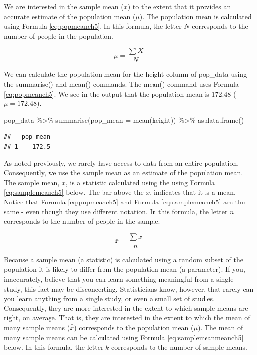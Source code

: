 \documentclass[
]{krantz}
\makeatletter
\newenvironment{Shaded}{\begin{snugshade}}{\end{snugshade}}
\newcommand{\AttributeTok}[1]{\textcolor[rgb]{0.61,0.61,0.61}{#1}}
\newcommand{\FunctionTok}[1]{\textcolor[rgb]{0,0,0}{#1}}
\newcommand{\NormalTok}[1]{#1}
\newcommand{\SpecialCharTok}[1]{\textcolor[rgb]{0,0,0}{#1}}
\newenvironment{kframe}{%
\medskip{}
\setlength{\fboxsep}{.8em}
 \def\at@end@of@kframe{}%
 \ifinner\ifhmode%
  \def\at@end@of@kframe{\end{minipage}}%
  \begin{minipage}{\columnwidth}%
 \fi\fi%
 \def\FrameCommand##1{\hskip\@totalleftmargin \hskip-\fboxsep
 \colorbox{shadecolor}{##1}\hskip-\fboxsep
     \hskip-\linewidth \hskip-\@totalleftmargin \hskip\columnwidth}%
 \MakeFramed {\advance\hsize-\width
   \@totalleftmargin\z@ \linewidth\hsize
   \@setminipage}}%
 {\par\unskip\endMakeFramed%
 \at@end@of@kframe}
\renewenvironment{Shaded}{\begin{kframe}}{\end{kframe}}
\makeatother
\begin{document}
We are interested in the sample mean (\(\bar{x}\)) to the extent that it provides an accurate estimate of the population mean (\(\mu\)). The population mean is calculated using Formula \eqref{eq:popmeanch5}. In this formula, the letter \(N\) corresponds to the number of people in the population.

\begin{equation} 
\mu = \frac{\sum{X}}{N}
      \label{eq:popmeanch5}
\end{equation}

We can calculate the population mean for the height column of pop\_data using the summarise() and mean() commands. The mean() command uses Formula \eqref{eq:popmeanch5}. We see in the output that the population mean is 172.48 (\(\mu = 172.48\)).

\begin{Shaded}
\begin{Highlighting}[]
\NormalTok{pop\_data }\SpecialCharTok{\%\textgreater{}\%}
  \FunctionTok{summarise}\NormalTok{(}\AttributeTok{pop\_mean =} \FunctionTok{mean}\NormalTok{(height)) }\SpecialCharTok{\%\textgreater{}\%}
  \FunctionTok{as.data.frame}\NormalTok{()}
\end{Highlighting}
\end{Shaded}

\begin{verbatim}
##   pop_mean
## 1    172.5
\end{verbatim}

As noted previously, we rarely have access to data from an entire population. Consequently, we use the sample mean as an estimate of the population mean. The sample mean, \(\bar{x}\), is a statistic calculated using the using Formula \eqref{eq:samplemeanch5} below. The bar above the \(x\), indicates that it is a mean. Notice that Formula \eqref{eq:popmeanch5} and Formula \eqref{eq:samplemeanch5} are the same - even though they use different notation. In this formula, the letter \(n\) corresponds to the number of people in the sample.

\begin{equation} 
\bar{x} = \frac{\sum{x}}{n}
      \label{eq:samplemeanch5}
\end{equation}

Because a sample mean (a statistic) is calculated using a random subset of the population it is likely to differ from the population mean (a parameter). If you, inaccurately, believe that you can learn something meaningful from a single study, this fact may be disconcerting. Statisticians know, however, that rarely can you learn anything from a single study, or even a small set of studies. Consequently, they are more interested in the extent to which sample means are right, on average. That is, they are interested in the extent to which the mean of many sample means (\(\bar{\bar{x}}\)) corresponds to the population mean (\(\mu\)). The mean of many sample means can be calculated using Formula \eqref{eq:samplemeanmeanch5} below. In this formula, the letter \(k\) corresponds to the number of sample means.
\end{document}
